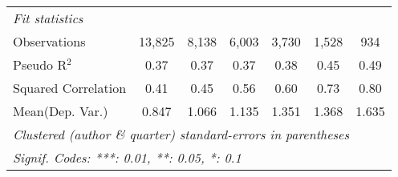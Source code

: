 \begin{tabular}{lcccccc}
   \midrule
   \emph{Fit statistics}\\
   Observations                                               & 13,825       & 8,138        & 6,003        & 3,730        & 1,528   & 934\\  
   Pseudo R$^2$                                               & 0.37         & 0.37         & 0.37         & 0.38         & 0.45    & 0.49\\  
   Squared Correlation                                        & 0.41         & 0.45         & 0.56         & 0.60         & 0.73    & 0.80\\  
Mean(Dep. Var.) & 0.847 & 1.066 & 1.135 & 1.351 & 1.368 & 1.635 \\
   \midrule \midrule
   \multicolumn{7}{l}{\emph{Clustered (author \& quarter) standard-errors in parentheses}}\\
   \multicolumn{7}{l}{\emph{Signif. Codes: ***: 0.01, **: 0.05, *: 0.1}}\\
\end{tabular}
\par\endgroup
